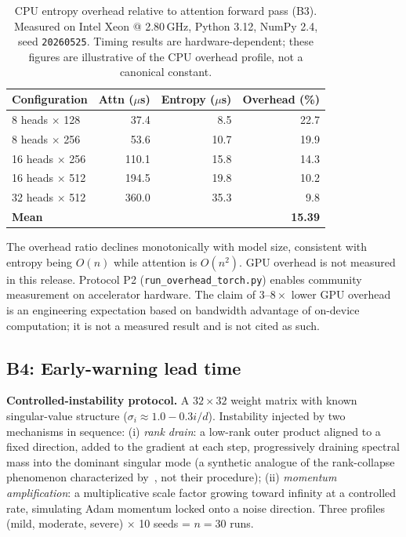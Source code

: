 \documentclass[11pt,a4paper]{article}
\theoremstyle{plain}
\begin{document}
\begin{table}[h]
\centering
\caption{CPU entropy overhead relative to attention forward pass (B3).
  Measured on Intel Xeon @ 2.80\,GHz, Python 3.12, NumPy 2.4,
  seed \texttt{20260525}. Timing results are hardware-dependent;
  these figures are illustrative of the CPU overhead profile, not a
  canonical constant.}
\label{tab:b3}
\begin{tabular}{lrrr}
\toprule
Configuration & Attn ($\mu$s) & Entropy ($\mu$s) & Overhead (\%) \\
\midrule
8 heads $\times$ 128  & 37.4  & 8.5  & 22.7 \\
8 heads $\times$ 256  & 53.6  & 10.7 & 19.9 \\
16 heads $\times$ 256 & 110.1 & 15.8 & 14.3 \\
16 heads $\times$ 512 & 194.5 & 19.8 & 10.2 \\
32 heads $\times$ 512 & 360.0 & 35.3 & 9.8 \\
\midrule
\textbf{Mean} & & & \textbf{15.39} \\
\bottomrule
\end{tabular}
\end{table}

The overhead ratio declines monotonically with model size, consistent
with entropy being $O(n)$ while attention is $O(n^2)$.
GPU overhead is not measured in this release.
Protocol P2 (\texttt{run\_overhead\_torch.py}) enables community
measurement on accelerator hardware.
The claim of $3$--$8\times$ lower GPU overhead is an engineering
expectation based on bandwidth advantage of on-device computation;
it is not a measured result and is not cited as such.

\subsection{B4: Early-warning lead time}
\label{sec:b4}

\textbf{Controlled-instability protocol.}
A $32 \times 32$ weight matrix with known singular-value structure
($\sigma_i \approx 1.0 - 0.3i/d$).
Instability injected by two mechanisms in sequence:
(i) \emph{rank drain}: a low-rank outer product aligned to a fixed
direction, added to the gradient at each step, progressively draining
spectral mass into the dominant singular mode
(a synthetic analogue of the rank-collapse phenomenon characterized
by~\citealt{dong2021attention}, not their procedure);
(ii) \emph{momentum amplification}: a multiplicative scale factor
growing toward infinity at a controlled rate, simulating Adam momentum
locked onto a noise direction.
Three profiles (mild, moderate, severe) $\times$ 10 seeds = $n = 30$
runs.
\end{document}
